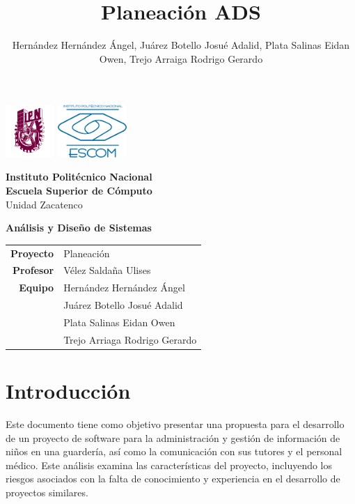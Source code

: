 \documentclass{article}
\author{Hernández Hernández Ángel, Juárez Botello Josué Adalid, Plata Salinas Eidan Owen, Trejo Arraiga Rodrigo Gerardo}
\title{Planeación ADS}
\begin{document}
\begin{titlepage}
	\centering
	\includegraphics[height=2cm]{Logo_IPN.png}
	\hfill
	\includegraphics[height=2cm]{escudoESCOM.png}

	\vspace{-1.5cm}
	\large\textbf{ Instituto Politécnico Nacional}\\
	\large\textbf{Escuela Superior de Cómputo}\\
	\large{Unidad Zacatenco}

	\vspace{2cm}

	\Large{\textbf{Análisis y Diseño de Sistemas}}

	\vspace{10cm}

	\begin{tabular}{rl}
		\textbf{Proyecto} & Planeación                    \\
		\textbf{Profesor} & Vélez Saldaña Ulises          \\
		\textbf{Equipo}
		                  & Hernández Hernández Ángel     \\
		                  & Juárez Botello Josué Adalid   \\
		                  & Plata Salinas Eidan Owen      \\
		                  & Trejo Arriaga Rodrigo Gerardo \\
	\end{tabular}
\end{titlepage}

\tableofcontents
\pagebreak

\section{Introducción}

Este documento tiene como objetivo presentar una propuesta para el desarrollo de un proyecto de software para la administración y gestión de información de niños en una guardería, así como la comunicación con sus tutores y el personal médico. Este análisis examina las características del proyecto, incluyendo los riesgos asociados con la falta de conocimiento y experiencia en el desarrollo de proyectos similares.
\end{document}
